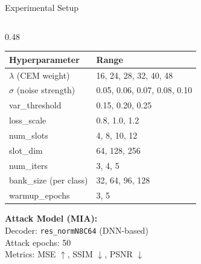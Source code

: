 \documentclass[aspectratio=169, 10pt]{beamer}
\newcommand{\code}[1]{\texttt{\small #1}}
\begin{document}
\begin{frame}{Experimental Setup}
\begin{columns}[T]
\begin{column}{0.48\textwidth}
\vspace{0.1cm}
\footnotesize
\begin{tabular}{ll}
\toprule
\textbf{Hyperparameter} & \textbf{Range} \\
\midrule
$\lambda$ (CEM weight) & 16, 24, 28, 32, 40, 48 \\
$\sigma$ (noise strength) & 0.05, 0.06, 0.07, 0.08, 0.10 \\
var\_threshold & 0.15, 0.20, 0.25 \\
loss\_scale & 0.8, 1.0, 1.2 \\
\midrule
num\_slots & 4, 8, 10, 12 \\
slot\_dim & 64, 128, 256 \\
num\_iters & 3, 4, 5 \\
bank\_size (per class) & 32, 64, 96, 128 \\
warmup\_epochs & 3, 5 \\
\bottomrule
\end{tabular}

\vspace{0.15cm}
\textbf{Attack Model (MIA):}\\
\footnotesize
Decoder: \code{res\_normN8C64} (DNN-based)\\
Attack epochs: 50\\
Metrics: MSE $\uparrow$, SSIM $\downarrow$, PSNR $\downarrow$
\end{column}
\end{columns}

\end{frame}
\end{document}

